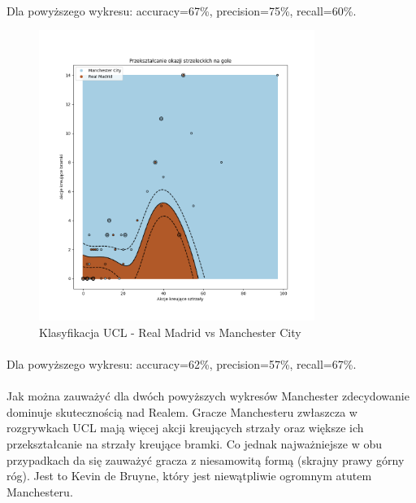 \documentclass[12pt, letterpaper]{article}
\begin{document}
\paragraph{} Dla powyższego wykresu: accuracy=67\%, precision=75\%, recall=60\%.
\begin{figure}[ht]
    \centering
    \includegraphics[width=0.8\textwidth]{images/062057067ManRealUCL.png}
    \caption{Klasyfikacja UCL - Real Madrid vs Manchester City}
    \label{fig:enter-label}
\end{figure}
\pagebreak
\paragraph{} Dla powyższego wykresu: accuracy=62\%, precision=57\%, recall=67\%.
\paragraph{} Jak można zauważyć dla dwóch powyższych wykresów Manchester zdecydowanie dominuje skutecznością nad Realem. Gracze Manchesteru zwłaszcza w rozgrywkach UCL mają więcej akcji kreujących strzały oraz większe ich przekształcanie na strzały kreujące bramki. Co jednak najważniejsze w obu przypadkach da się zauważyć gracza z niesamowitą formą (skrajny prawy górny róg). Jest to Kevin de Bruyne, który jest niewątpliwie ogromnym atutem Manchesteru.
\pagebreak
\end{document}
